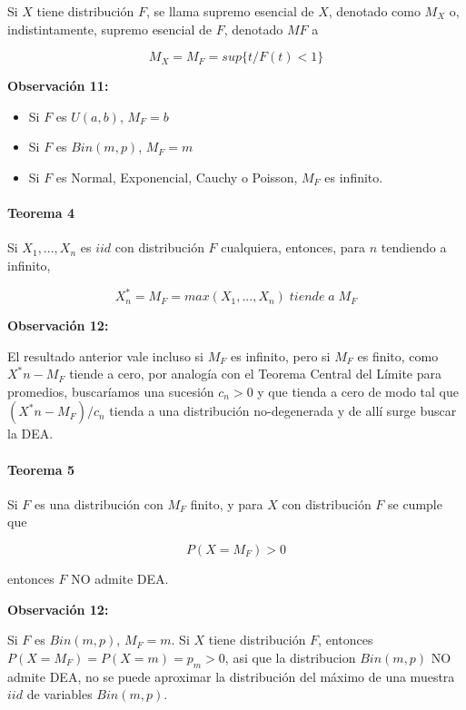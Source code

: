 \documentclass[
  oneside]{book}
\begin{document}
Si \(X\) tiene distribución \(F\), se llama supremo esencial de \(X\),
denotado como \(M_X\) o, indistintamente, supremo esencial de \(F\),
denotado \(MF\) a

\begin{equation}
M_X=M_F= sup\{t / F(t)<1\}\label{eq:Mx}
\end{equation}

\textbf{Observación 11:}

\begin{itemize}
\item Si $F$ es $U(a,b)$, $M_F=b$
\item Si $F$ es $Bin(m,p)$, $M_F=m$
\item Si $F$ es Normal, Exponencial, Cauchy o Poisson, $M_F$ es infinito.
\end{itemize}

\hypertarget{teorema-4}{%
\paragraph{Teorema 4}\label{teorema-4}}

Si \(X_1,...,X_n\) es \(iid\) con distribución \(F\) cualquiera,
entonces, para \(n\) tendiendo a infinito,

\begin{equation}
X^*_n=M_F= max(X_1,...,X_n)\;tiende\;a\;M_F\label{eq:Xast}
\end{equation}

\textbf{Observación 12:}

El resultado anterior vale incluso si \(M_F\) es infinito, pero si
\(M_F\) es finito, como \(X^*n - M_F\) tiende a cero, por analogía con
el Teorema Central del Límite para promedios, buscaríamos una sucesión
\(c_n>0\) y que tienda a cero de modo tal que \((X^*n- M_F )/ c_n\)
tienda a una distribución no-degenerada y de allí surge buscar la DEA.

\hypertarget{teorema-5}{%
\paragraph{Teorema 5}\label{teorema-5}}

Si \(F\) es una distribución con \(M_F\) finito, y para \(X\) con
distribución \(F\) se cumple que

\[
P(X=M_F)>0 
\]

entonces \(F\) NO admite DEA.

\textbf{Observación 12:}

Si \(F\) es \(Bin(m,p)\), \(M_F=m\). Si \(X\) tiene distribución \(F\),
entonces \(P( X=M_F)= P( X=m)= p_m>0\), asi que la distribucion
\(Bin(m,p)\) NO admite DEA, no se puede aproximar la distribución del
máximo de una muestra \(iid\) de variables \(Bin(m,p)\).
\end{document}
